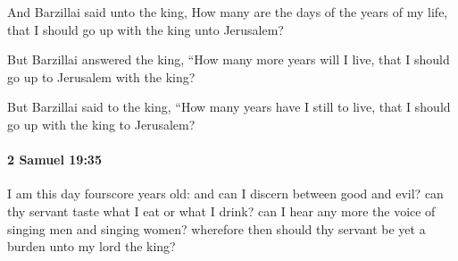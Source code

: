 			\begin{versebox}
					\item[BHS] 
					\item[ASV] And Barzillai said unto the king, How many are the days of the years of my life, that I should go up with the king unto Jerusalem?
					\item[NIV] But Barzillai answered the king, “How many more years will I live, that I should go up to Jerusalem with the king?
					\item[NRSV] But Barzillai said to the king, “How many years have I still to live, that I should go up with the king to Jerusalem?
			\end{versebox}

		\paragraph{2 Samuel 19:35} %
			\label{2SAMUEL-19-35}

			I am this day fourscore years old: and can I discern between good and evil? can thy servant taste what I eat or what I drink? can I hear any more the voice of singing men and singing women? wherefore then should thy servant be yet a burden unto my lord the king?

